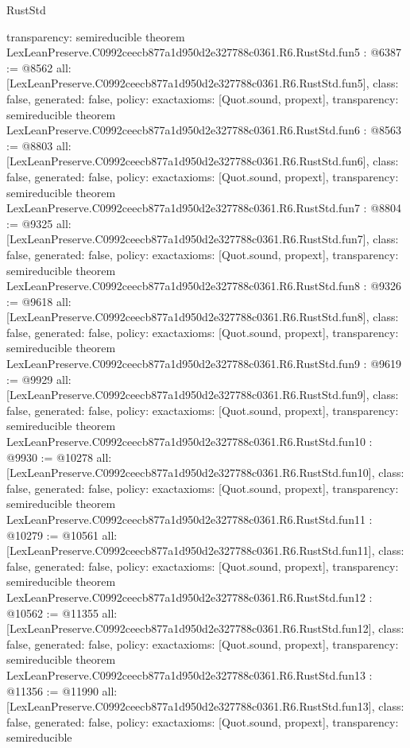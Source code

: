 \begin{lexlean}{RustStd}
\begin{coremodule}
{  transparency: semireducible
}
theorem LexLeanPreserve.C0992ceecb877a1d950d2e327788c0361.R6.RustStd.fun5 : @6387 := @8562 {
  all: [LexLeanPreserve.C0992ceecb877a1d950d2e327788c0361.R6.RustStd.fun5],
  class: false,
  generated: false,
  policy: exact{axioms: [Quot.sound, propext]},
  transparency: semireducible
}
theorem LexLeanPreserve.C0992ceecb877a1d950d2e327788c0361.R6.RustStd.fun6 : @8563 := @8803 {
  all: [LexLeanPreserve.C0992ceecb877a1d950d2e327788c0361.R6.RustStd.fun6],
  class: false,
  generated: false,
  policy: exact{axioms: [Quot.sound, propext]},
  transparency: semireducible
}
theorem LexLeanPreserve.C0992ceecb877a1d950d2e327788c0361.R6.RustStd.fun7 : @8804 := @9325 {
  all: [LexLeanPreserve.C0992ceecb877a1d950d2e327788c0361.R6.RustStd.fun7],
  class: false,
  generated: false,
  policy: exact{axioms: [Quot.sound, propext]},
  transparency: semireducible
}
theorem LexLeanPreserve.C0992ceecb877a1d950d2e327788c0361.R6.RustStd.fun8 : @9326 := @9618 {
  all: [LexLeanPreserve.C0992ceecb877a1d950d2e327788c0361.R6.RustStd.fun8],
  class: false,
  generated: false,
  policy: exact{axioms: [Quot.sound, propext]},
  transparency: semireducible
}
theorem LexLeanPreserve.C0992ceecb877a1d950d2e327788c0361.R6.RustStd.fun9 : @9619 := @9929 {
  all: [LexLeanPreserve.C0992ceecb877a1d950d2e327788c0361.R6.RustStd.fun9],
  class: false,
  generated: false,
  policy: exact{axioms: [Quot.sound, propext]},
  transparency: semireducible
}
theorem LexLeanPreserve.C0992ceecb877a1d950d2e327788c0361.R6.RustStd.fun10 : @9930 := @10278 {
  all: [LexLeanPreserve.C0992ceecb877a1d950d2e327788c0361.R6.RustStd.fun10],
  class: false,
  generated: false,
  policy: exact{axioms: [Quot.sound, propext]},
  transparency: semireducible
}
theorem LexLeanPreserve.C0992ceecb877a1d950d2e327788c0361.R6.RustStd.fun11 : @10279 := @10561 {
  all: [LexLeanPreserve.C0992ceecb877a1d950d2e327788c0361.R6.RustStd.fun11],
  class: false,
  generated: false,
  policy: exact{axioms: [Quot.sound, propext]},
  transparency: semireducible
}
theorem LexLeanPreserve.C0992ceecb877a1d950d2e327788c0361.R6.RustStd.fun12 : @10562 := @11355 {
  all: [LexLeanPreserve.C0992ceecb877a1d950d2e327788c0361.R6.RustStd.fun12],
  class: false,
  generated: false,
  policy: exact{axioms: [Quot.sound, propext]},
  transparency: semireducible
}
theorem LexLeanPreserve.C0992ceecb877a1d950d2e327788c0361.R6.RustStd.fun13 : @11356 := @11990 {
  all: [LexLeanPreserve.C0992ceecb877a1d950d2e327788c0361.R6.RustStd.fun13],
  class: false,
  generated: false,
  policy: exact{axioms: [Quot.sound, propext]},
  transparency: semireducible
}
\end{coremodule}
\end{lexlean}
